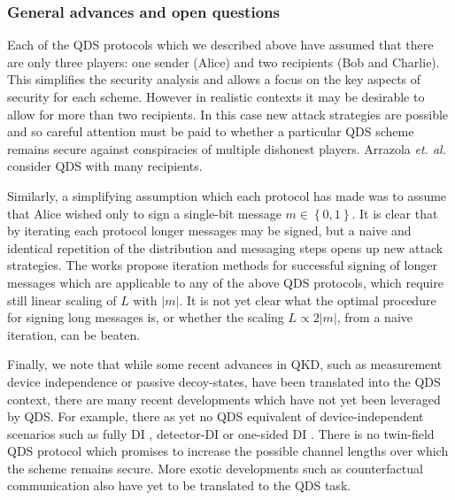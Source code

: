 \subsubsection*{General advances and open questions}
Each of the QDS protocols which we described above have assumed that there are only three players: one sender (Alice) and two recipients (Bob and Charlie). This simplifies the security analysis and allows a focus on the key aspects of security for each scheme. However in realistic contexts it may be desirable to allow for more than two recipients. In this case new attack strategies are possible and so careful attention must be paid to whether a particular QDS scheme remains secure against conspiracies of multiple dishonest players. Arrazola \emph{et. al.} \cite{Arrazola2015} consider QDS with many recipients. %

Similarly, a simplifying assumption which each protocol has made was to assume that Alice wished only to sign a single-bit message $m \in \left\{0, 1\right\}$. It is clear that by iterating each protocol longer messages may be signed, but a naive and identical repetition of the distribution and messaging steps opens up new attack strategies. The works \cite{Wang2015, Wang2017} propose iteration methods for successful signing of longer messages which are applicable to any of the above QDS protocols, which require still linear scaling of $L$ with $\left|m\right|$. It is not yet clear what the optimal procedure for signing long messages is, or whether the scaling $L \propto 2 \left|m\right|$, from a naive iteration, can be beaten. %

Finally, we note that while some recent advances in QKD, such as measurement device independence or passive decoy-states, have been translated into the QDS context, there are many recent developments which have not yet been leveraged by QDS. For example, there as yet no QDS equivalent of device-independent scenarios such as fully DI \cite{Vazirani2014}, detector-DI \cite{Lim2014a} or one-sided DI \cite{Walk2016a}. There is no twin-field \cite{Curty2018} QDS protocol which promises to increase the possible channel lengths over which the scheme remains secure. More exotic developments such as counterfactual communication \cite{Noh2009, Salih2013a, Hance2019, Vaidman2019} also have yet to be translated to the QDS task. 

